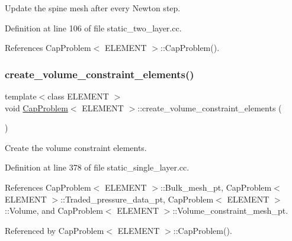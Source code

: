 Update the spine mesh after every Newton step. 



Definition at line 106 of file static\+\_\+two\+\_\+layer.\+cc.



References Cap\+Problem$<$ E\+L\+E\+M\+E\+N\+T $>$\+::\+Cap\+Problem().

\mbox{\label{classCapProblem_aa3a891fe6f5fc5fb5829e3bf636eda2c}} 
\subsubsection{\texorpdfstring{create\+\_\+volume\+\_\+constraint\+\_\+elements()}{create\_volume\_constraint\_elements()}\hspace{0.1cm}{\footnotesize\ttfamily [1/2]}}
{\footnotesize\ttfamily template$<$class E\+L\+E\+M\+E\+NT $>$ \\
void \hyperlink{classCapProblem}{Cap\+Problem}$<$ E\+L\+E\+M\+E\+NT $>$\+::create\+\_\+volume\+\_\+constraint\+\_\+elements (\begin{DoxyParamCaption}{ }\end{DoxyParamCaption})}



Create the volume constraint elements. 



Definition at line 378 of file static\+\_\+single\+\_\+layer.\+cc.



References Cap\+Problem$<$ E\+L\+E\+M\+E\+N\+T $>$\+::\+Bulk\+\_\+mesh\+\_\+pt, Cap\+Problem$<$ E\+L\+E\+M\+E\+N\+T $>$\+::\+Traded\+\_\+pressure\+\_\+data\+\_\+pt, Cap\+Problem$<$ E\+L\+E\+M\+E\+N\+T $>$\+::\+Volume, and Cap\+Problem$<$ E\+L\+E\+M\+E\+N\+T $>$\+::\+Volume\+\_\+constraint\+\_\+mesh\+\_\+pt.



Referenced by Cap\+Problem$<$ E\+L\+E\+M\+E\+N\+T $>$\+::\+Cap\+Problem().

\mbox{\label{classCapProblem_aa3a891fe6f5fc5fb5829e3bf636eda2c}} 
